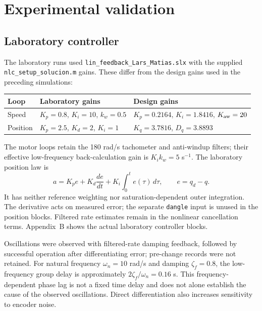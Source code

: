 \section*{Experimental validation}
\subsection*{Laboratory controller}
The laboratory runs used \texttt{lin\_feedback\_Lars\_Matias.slx} with the supplied \texttt{nlc\_setup\_solucion.m} gains. These differ from the design gains used in the preceding simulations:
\begin{center}
\small
\begin{tabular}{lll}
\hline
Loop & Laboratory gains & Design gains\\\hline
Speed & $K_p=0.8$, $K_i=10$, $k_w=0.5$ & $K_p=0.2164$, $K_i=1.8416$, $K_{\rm aw}=20$\\
Position & $K_p=2.5$, $K_d=2$, $K_i=1$ & $K_q=3.7816$, $D_q=3.8893$\\\hline
\end{tabular}
\end{center}
The motor loops retain the 180 rad/s tachometer and anti-windup filters; their effective low-frequency back-calculation gain is $K_i k_w=5$ s$^{-1}$. The laboratory position law is
\begin{equation}
a=K_pe+K_d\frac{de}{dt}+K_i\int_0^t e(\tau)\,d\tau,\qquad e=q_d-q.
\end{equation}
It has neither reference weighting nor saturation-dependent outer integration. The derivative acts on measured error; the separate \texttt{dangle} input is unused in the position blocks. Filtered rate estimates remain in the nonlinear cancellation terms. Appendix~B shows the actual laboratory controller blocks.

Oscillations were observed with filtered-rate damping feedback, followed by successful operation after differentiating error; pre-change records were not retained. For natural frequency $\omega_n=10$ rad/s and damping $\zeta_f=0.8$, the low-frequency group delay is approximately $2\zeta_f/\omega_n=0.16$ s. This frequency-dependent phase lag is not a fixed time delay and does not alone establish the cause of the observed oscillations. Direct differentiation also increases sensitivity to encoder noise.

